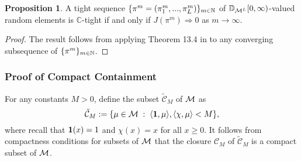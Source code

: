 \documentclass{article}
\theoremstyle{definition}
\newtheorem{proposition}[theorem]{Proposition}
\numberwithin{equation}{section}
\begin{document}
\begin{proposition}\label{prop_Ctight_cond}
A tight sequence $\{\pi^m=(\pi^m_1,...,\pi^m_L)\}_{m\in\mathbb{N}}$ of $\mathbb{D}_{\mathcal{M}^L}[0,\infty)$-valued random elements is $\mathbb{C}$-tight if and only if $J(\pi^m)\Rightarrow 0$ as $m\to\infty.$
\end{proposition}
\begin{proof}
The result follows from applying Theorem 13.4 in \cite{BillingsleyBook} to any converging subsequence of $\{\pi^m\}_{m\in\mathbb{N}}$.
\end{proof}




\subsubsection{Proof of Compact Containment}

For any constants $M>0$, define the subset $\tilde{\mathcal{C}}_M$ of $\mathcal{M}$ as
\[
\tilde{\mathcal{C}}_M := \{\mu\in\Mset \;:\;  \langle\f1,\mu\rangle, \langle\chi,\mu\rangle < M \},
\]
where recall that $\f1(x)=1$ and $\chi(x)=x$ for all $x\geq0$. It follows from compactness conditions \cite[Theorem 4.2]{kallenberg} for subsets of $\mathcal{M}$ that the closure $\mathcal{C}_M$ of $\tilde{\mathcal{C}}_M$ is a compact subset of $\mathcal{M}$.
\end{document}
